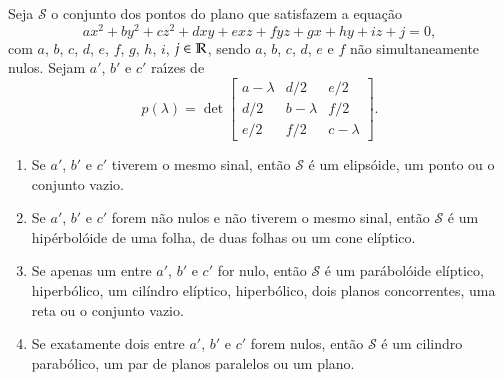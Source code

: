 \begin{teorema}
  Seja $\mathcal{S}$ o conjunto dos pontos do plano que satisfazem a equa\c{c}\~ao
  \[
    ax^2 + by^2 + cz^2 + dxy + exz + fyz + gx + hy + iz + j = 0,
  \]
  com $a$, $b$, $c$, $d$, $e$, $f$, $g$, $h$, $i$, $j \in \mathbb{R}$, sendo $a$, $b$, $c$, $d$, $e$ e $f$ n\~ao simultaneamente nulos. Sejam $a'$, $b'$ e $c'$ ra{\'\i}zes de
  \[
    p(\lambda) = \det \begin{bmatrix}
      a - \lambda & d/2 & e/2 \\
      d/2 & b - \lambda & f/2\\
      e/2 & f/2 & c - \lambda
    \end{bmatrix}.
  \]
  \begin{enumerate}[label=({\roman*})]
    \item Se $a'$, $b'$ e $c'$ tiverem o mesmo sinal, ent\~ao $\mathcal{S}$ \'e um elipsóide, um ponto ou o conjunto vazio.
    \item Se $a'$, $b'$ e $c'$ forem não nulos e não tiverem o mesmo sinal, ent\~ao $\mathcal{S}$ \'e um hip\'erbolóide de uma folha, de duas folhas ou um cone elíptico.
    \item Se apenas um entre $a'$, $b'$ e $c'$ for nulo, ent\~ao $\mathcal{S}$ \'e um par\'abolóide elíptico, hiperbólico, um cilíndro elíptico, hiperbólico, dois planos concorrentes, uma reta ou o conjunto vazio.
    \item Se exatamente dois entre $a'$, $b'$ e $c'$ forem nulos, então $\mathcal{S}$ é um cilindro parabólico, um par de planos paralelos ou um plano.
  \end{enumerate}
\end{teorema}





